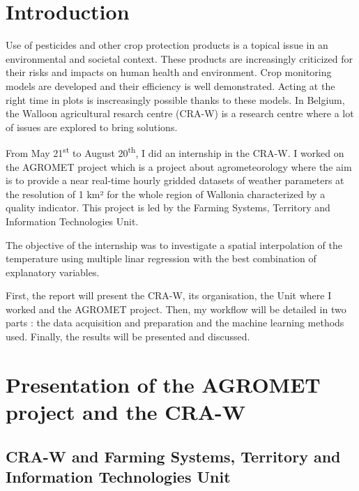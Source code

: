 \documentclass[12pt,twoside]{reedthesis}
\theoremstyle{definition}
\theoremstyle{definition}
\theoremstyle{definition}
\theoremstyle{remark}
\begin{document}
\mainmatter %
\pagestyle{fancyplain} %

\chapter*{Introduction}\label{introduction}

Use of pesticides and other crop protection products is a topical issue
in an environmental and societal context. These products are
increasingly criticized for their risks and impacts on human health and
environment. Crop monitoring models are developed and their efficiency
is well demonstrated. Acting at the right time in plots is inscreasingly
possible thanks to these models. In Belgium, the Walloon agricultural
resarch centre (CRA-W) is a research centre where a lot of issues are
explored to bring solutions.

From May 21\textsuperscript{st} to August 20\textsuperscript{th}, I did
an internship in the CRA-W. I worked on the AGROMET project which is a
project about agrometeorology where the aim is to provide a near
real-time hourly gridded datasets of weather parameters at the
resolution of 1 km² for the whole region of Wallonia characterized by a
quality indicator. This project is led by the Farming Systems, Territory
and Information Technologies Unit.

The objective of the internship was to investigate a spatial
interpolation of the temperature using multiple linar regression with
the best combination of explanatory variables.

First, the report will present the CRA-W, its organisation, the Unit
where I worked and the AGROMET project. Then, my workflow will be
detailed in two parts : the data acquisition and preparation and the
machine learning methods used. Finally, the results will be presented
and discussed.

\chapter{Presentation of the AGROMET project and the
CRA-W}\label{presentation}

\section{CRA-W and Farming Systems, Territory and Information
Technologies
Unit}\label{cra-w-and-farming-systems-territory-and-information-technologies-unit}
\end{document}
